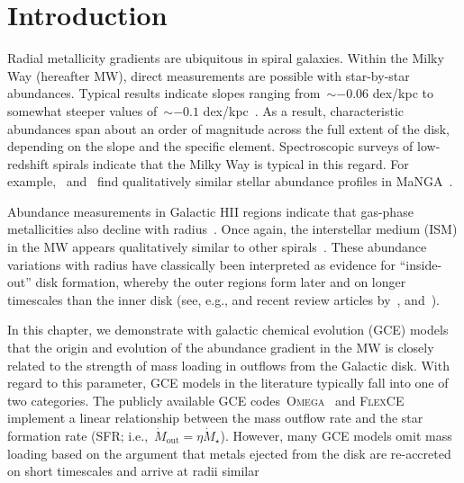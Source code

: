 \section{Introduction}
\label{outflows:sec:intro}
Radial metallicity gradients are ubiquitous in spiral galaxies.
Within the Milky Way (hereafter MW), direct measurements are possible with
star-by-star abundances.
Typical results indicate slopes ranging from~$\sim$$-0.06$ dex/kpc to somewhat
steeper values of~$\sim$$-0.1$ dex/kpc~\citep[e.g.,][]{Nordstroem2004,
Cheng2012, Frinchaboy2013, Hayden2014, Weinberg2019, Myers2022}.
As a result, characteristic abundances span about an order of magnitude across
the full extent of the disk, depending on the slope and the specific element.
Spectroscopic surveys of low-redshift spirals indicate that the Milky Way is
typical in this regard.
For example,~\citet{Goddard2017} and~\citet{Parikh2021} find qualitatively
similar stellar abundance profiles in MaNGA~\citep{Bundy2015}.
\par
Abundance measurements in Galactic HII regions indicate that gas-phase
metallicities also decline with radius~\citep[e.g.,][]{Simpson1995,
Afflerbach1997, Esteban2022, MendezDelgado2022, MendezDelgado2023}.
Once again, the interstellar medium (ISM) in the MW appears qualitatively
similar to other spirals~\citep[e.g.,][]{Belfiore2017, Berg2020,
Franchetto2021, Lutz2021, Boardman2022}.
These abundance variations with radius have classically been interpreted as
evidence for ``inside-out'' disk formation, whereby the outer regions form
later and on longer timescales than the inner disk (see, e.g.,
\citealt{Kauffmann1996} and recent review articles by~\citealt{Kewley2019,
Maiolino2019}, and~\citealt{Sanchez2020}).
\par
In this chapter, we demonstrate with galactic chemical evolution (GCE) models
that the origin and evolution of the abundance gradient in the MW is closely
related to the strength of mass loading in outflows from the Galactic disk.
With regard to this parameter, GCE models in the literature typically fall into
one of two categories.
The publicly available GCE codes~\textsc{Omega}~\citep{Cote2017} and
\textsc{FlexCE}~\citep{Andrews2017} implement a linear relationship between the
mass outflow rate and the star formation rate (SFR;
i.e.,~$\dot{M}_\text{out} = \eta \dot{M}_\star$).
However, many GCE models omit mass loading
\citep[i.e.,~$\eta = 0$; e.g.,][]{Minchev2013, Minchev2014, Spitoni2019,
Spitoni2020, Spitoni2021, Gjergo2023} based on the argument that metals ejected
from the disk are re-accreted on short timescales and arrive at radii similar
